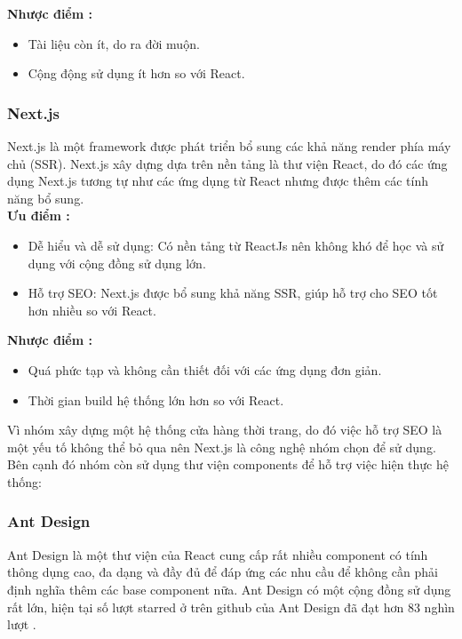 \textbf{Nhược điểm \cite{technologyFE}:}
\begin{itemize}
    \item Tài liệu còn ít, do ra đời muộn.
    \item Cộng động sử dụng ít hơn so với React.
\end{itemize}

\subsubsection{Next.js}

\hspace*{0.5cm} Next.js là một framework được phát triển bổ sung các khả năng render phía máy chủ (SSR). Next.js xây dựng dựa trên nền tảng là thư viện React, do đó các ứng dụng Next.js tương tự như các ứng dụng từ React nhưng được thêm các tính năng bổ sung.\\


\textbf{Ưu điểm \cite{technologyNextAdvance}:}
\begin{itemize}
    \item Dễ hiểu và dễ sử dụng: Có nền tảng từ ReactJs nên không khó để học và sử dụng với cộng đồng sử dụng lớn.
    \item Hỗ trợ SEO: Next.js được bổ sung khả năng SSR, giúp hỗ trợ cho SEO tốt hơn nhiều so với React.
\end{itemize}

\textbf{Nhược điểm \cite{technologyNextAdvance}:}
\begin{itemize}
    \item Quá phức tạp và không cần thiết đối với các ứng dụng đơn giản.
    \item Thời gian build hệ thống lớn hơn so với React.
\end{itemize}

Vì nhóm xây dựng một hệ thống cửa hàng thời trang, do đó việc hỗ trợ SEO là một yếu tố không thể bỏ qua nên Next.js là công nghệ nhóm chọn để sử dụng. \\

Bên cạnh đó nhóm còn sử dụng thư viện components để hỗ trợ việc hiện thực hệ thống:

\subsubsection*{Ant Design}
\hspace*{0.5cm} Ant Design là một thư viện của React cung cấp rất nhiều component có tính thông dụng cao, đa dạng và đầy đủ để đáp ứng các nhu cầu để không cần phải định nghĩa thêm các base component nữa. Ant Design có một cộng đồng sử dụng rất lớn, hiện tại số lượt starred ở trên github của Ant Design đã đạt hơn 83 nghìn lượt \cite{technologyAntdStar}.

